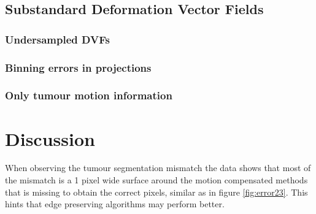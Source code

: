\subsection{Substandard Deformation Vector Fields}
\subsubsection{Undersampled DVFs}
\subsubsection{Binning errors in projections}
\subsubsection{Only tumour motion information}

\section{Discussion}
When observing the tumour segmentation mismatch the data shows that most of the mismatch is a 1 pixel wide surface around the motion compensated methods that is missing to obtain the correct pixels, similar as in figure \ref{fig:error23}. This hints that edge preserving algorithms may perform better.